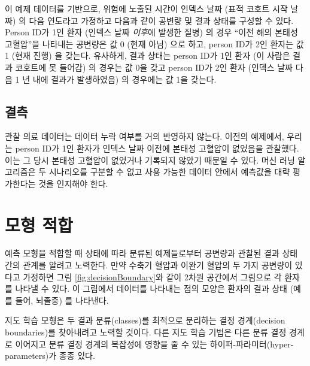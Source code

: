 \documentclass[11pt]{book}
\theoremstyle{definition}
\theoremstyle{definition}
\theoremstyle{definition}
\theoremstyle{remark}
\begin{document}
이 예제 데이터를 기반으로, 위험에 노출된 시간이 인덱스 날짜 (표적 코호트
시작 날짜) 의 다음 연도라고 가정하고 다음과 같이 공변량 및 결과 상태를
구성할 수 있다. Person ID가 1인 환자 (인덱스 날짜 \emph{이후}에 발생한
질병) 의 경우 ``이전 해의 본태성 고혈압''을 나타내는 공변량은 값 0 (현재
아님) 으로 하고, person ID가 2인 환자는 값 1 (현재 진행) 을 갖는다.
유사하게, 결과 상태는 person ID가 1인 환자 (이 사람은 결과 코호트에 못
들어감) 의 경우는 값 0을 갖고 person ID가 2인 환자 (인덱스 날짜 다음 1
년 내에 결과가 발생하였음) 의 경우에는 값 1을 갖는다.

\subsection{결측}

관찰 의료 데이터는 데이터 누락 여부를 거의 반영하지 않는다. 이전의
예제에서, 우리는 person ID가 1인 환자가 인덱스 날짜 이전에 본태성
고혈압이 없었음을 관찰했다. 이는 그 당시 본태성 고혈압이 없었거나
기록되지 않았기 때문일 수 있다. 머신 러닝 알고리즘은 두 시나리오를
구분할 수 없고 사용 가능한 데이터 안에서 예측값을 대략 평가한다는 것을
인지해야 한다. 

\section{모형 적합}\label{modelFitting}

예측 모형을 적합할 때 상태에 따라 분류된 예제들로부터 공변량과 관찰된
결과 상태 간의 관계를 알려고 노력한다. 만약 수축기 혈압과 이완기 혈압의
두 가지 공변량이 있다고 가정하면 그림 \ref{fig:decisionBoundary}와 같이
2차원 공간에서 그림으로 각 환자를 나타낼 수 있다. 이 그림에서 데이터를
나타내는 점의 모양은 환자의 결과 상태 (예를 들어, 뇌졸중) 를 나타낸다.

지도 학습 모형은 두 결과 분류(classes)를 최적으로 분리하는 결정
경계(decision boundaries)를 찾아내려고 노력할 것이다. 다른 지도 학습
기법은 다른 분류 결정 경계로 이어지고 분류 결정 경계의 복잡성에 영향을
줄 수 있는 하이퍼-파라미터(hyper-parameters)가 종종 있다.
\end{document}
